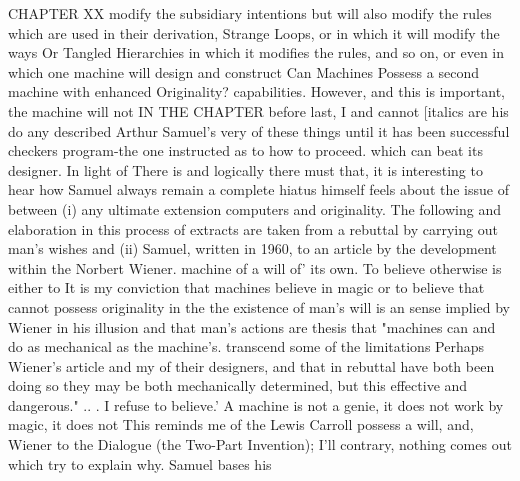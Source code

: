          CHAPTER XX                            modify the subsidiary intentions
                                               but will also modify the rules
                                               which are used in their derivation,
     Strange Loops,                            or in which it will modify the ways
 Or Tangled Hierarchies                        in which it modifies the rules, and
                                               so on, or even in which one
                                               machine will design and construct
      Can Machines Possess
                                               a second machine with enhanced
          Originality?                         capabilities. However, and this is
                                               important, the machine will not
IN THE CHAPTER before last, I                  and cannot [italics are his do any
described       Arthur     Samuel's   very     of these things until it has been
successful checkers program-the one            instructed as to how to proceed.
which can beat its designer. In light of       There is and logically there must
that, it is interesting to hear how Samuel     always remain a complete hiatus
himself feels about the issue of               between (i) any ultimate extension
computers and originality. The following       and elaboration in this process of
extracts are taken from a rebuttal by          carrying out man's wishes and (ii)
Samuel, written in 1960, to an article by      the development within the
Norbert Wiener.                                machine of a will of' its own. To
                                               believe otherwise is either to
   It is my conviction that machines           believe in magic or to believe that
   cannot possess originality in the           the existence of man's will is an
   sense implied by Wiener in his              illusion and that man's actions are
   thesis that "machines can and do            as mechanical as the machine's.
   transcend some of the limitations           Perhaps Wiener's article and my
   of their designers, and that in             rebuttal     have     both     been
   doing so they may be both                   mechanically determined, but this
   effective and dangerous." .. .              I refuse to believe.'
   A machine is not a genie, it does
   not work by magic, it does not            This reminds me of the Lewis Carroll
   possess a will, and, Wiener to the        Dialogue (the Two-Part Invention); I'll
   contrary, nothing comes out which         try to explain why. Samuel bases his
